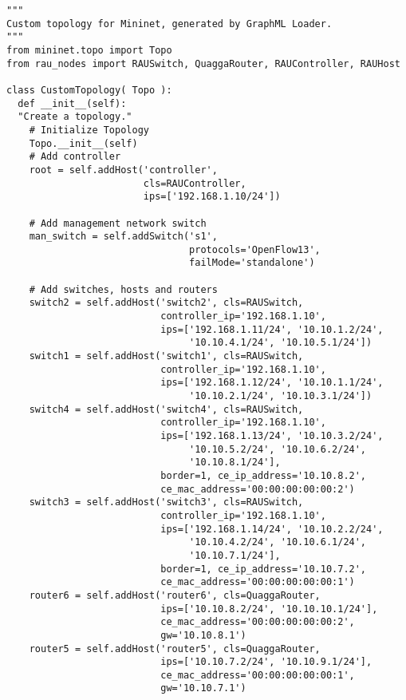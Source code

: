 \begin{verbatim}
"""
Custom topology for Mininet, generated by GraphML Loader.
"""
from mininet.topo import Topo
from rau_nodes import RAUSwitch, QuaggaRouter, RAUController, RAUHost

class CustomTopology( Topo ):
  def __init__(self):
  "Create a topology."
    # Initialize Topology
    Topo.__init__(self)
    # Add controller
    root = self.addHost('controller',
                        cls=RAUController,
                        ips=['192.168.1.10/24'])
      
    # Add management network switch
    man_switch = self.addSwitch('s1',
                                protocols='OpenFlow13',
                                failMode='standalone')
      
    # Add switches, hosts and routers
    switch2 = self.addHost('switch2', cls=RAUSwitch,
                           controller_ip='192.168.1.10',
                           ips=['192.168.1.11/24', '10.10.1.2/24',
                                '10.10.4.1/24', '10.10.5.1/24'])
    switch1 = self.addHost('switch1', cls=RAUSwitch,
                           controller_ip='192.168.1.10',
                           ips=['192.168.1.12/24', '10.10.1.1/24',
                                '10.10.2.1/24', '10.10.3.1/24'])
    switch4 = self.addHost('switch4', cls=RAUSwitch,
                           controller_ip='192.168.1.10',
                           ips=['192.168.1.13/24', '10.10.3.2/24',
                                '10.10.5.2/24', '10.10.6.2/24',
                                '10.10.8.1/24'],
                           border=1, ce_ip_address='10.10.8.2',
                           ce_mac_address='00:00:00:00:00:2')
    switch3 = self.addHost('switch3', cls=RAUSwitch,
	                       controller_ip='192.168.1.10',
	                       ips=['192.168.1.14/24', '10.10.2.2/24',
	                            '10.10.4.2/24', '10.10.6.1/24',
	                            '10.10.7.1/24'],
	                       border=1, ce_ip_address='10.10.7.2',
	                       ce_mac_address='00:00:00:00:00:1')
    router6 = self.addHost('router6', cls=QuaggaRouter,
                           ips=['10.10.8.2/24', '10.10.10.1/24'],
                           ce_mac_address='00:00:00:00:00:2',
                           gw='10.10.8.1')
    router5 = self.addHost('router5', cls=QuaggaRouter,
                           ips=['10.10.7.2/24', '10.10.9.1/24'],
                           ce_mac_address='00:00:00:00:00:1',
                           gw='10.10.7.1')

\end{verbatim}
